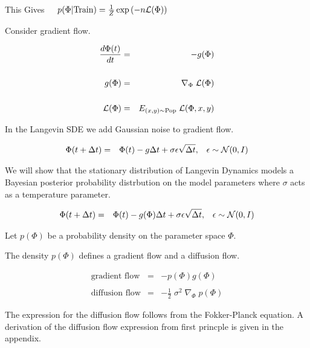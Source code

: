 {{\vfill
\centerline{This Gives{\color{red} $~\;\;\;p(\Phi|\mathrm{Train}) = \frac{1}{Z}\exp\left(-n{\cal L}(\Phi)\right)$}}
}


Consider gradient flow.

\begin{eqnarray*}
\frac{d\Phi(t)}{dt} & = & - g(\Phi) \\
\\
g(\Phi) & = & \nabla_\Phi\;{\cal L}(\Phi) \\
\\
{\cal L}(\Phi) & = & E_{(x,y) \sim \mathrm{Pop}}\;{\cal L}(\Phi,x,y)
\end{eqnarray*}


In the Langevin SDE we add Gaussian noise to gradient flow.

\begin{eqnarray*}
\Phi(t + \Delta t) & = & \Phi(t) - g\Delta t + \sigma \epsilon \sqrt{\Delta t},\;\;\;\epsilon \sim {\cal N}(0,I)
\end{eqnarray*}

\vfill
We will show that the stationary distribution of Langevin Dynamics models a Bayesian posterior probability distrbution on
the model parameters where $\sigma$ acts as a temperature parameter.



\begin{eqnarray*}
\Phi(t + \Delta t) & = & \Phi(t) - g(\Phi)\Delta t + \sigma\epsilon \sqrt{\Delta t},\;\;\;\epsilon \sim {\cal N}(0,I)
\end{eqnarray*}

Let $p(\Phi)$ be a probability density on the parameter space $\Phi$.

\vfill
The density $p(\Phi)$ defines a gradient flow and a diffusion flow.

\begin{eqnarray*}
\mbox{gradient flow} & = & - p(\Phi)g(\Phi) \\
\\
\mbox{diffusion flow} & = & - \frac{1}{2} \;\sigma^2\;\nabla_\Phi\; p(\Phi)
\end{eqnarray*}

\vfill
The expression for the diffusion flow follows from the Fokker-Planck equation. A derivation of the diffusion flow expression from first princple is given in the appendix.

}
